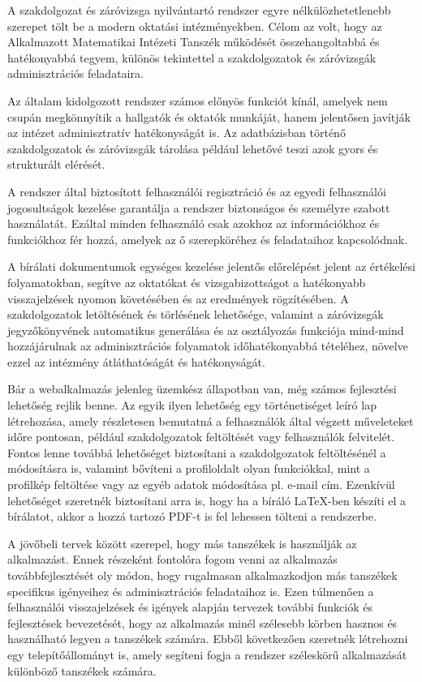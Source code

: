 

A szakdolgozat és záróvizsga nyilvántartó rendszer egyre nélkülözhetetlenebb szerepet tölt be a modern oktatási intézményekben. Célom az volt, hogy az Alkalmazott Matematikai Intézeti Tanszék működését összehangoltabbá és hatékonyabbá tegyem, különös tekintettel a szakdolgozatok és záróvizsgák adminisztrációs feladataira.

Az általam kidolgozott rendszer számos előnyös funkciót kínál, amelyek nem csupán megkönnyítik a hallgatók és oktatók munkáját, hanem jelentősen javítják az intézet adminisztratív hatékonyságát is. Az adatbázisban történő szakdolgozatok és záróvizsgák tárolása például lehetővé teszi azok gyors és strukturált elérését.

A rendszer által biztosított felhasználói regisztráció és az egyedi felhasználói jogosultságok kezelése garantálja a rendszer biztonságos és személyre szabott használatát. Ezáltal minden felhasználó csak azokhoz az információkhoz és funkciókhoz fér hozzá, amelyek az ő szerepköréhez és feladataihoz kapcsolódnak.

A bírálati dokumentumok egységes kezelése jelentős előrelépést jelent az értékelési folyamatokban, segítve az oktatókat és vizsgabizottságot a hatékonyabb visszajelzések nyomon követésében és az eredmények rögzítésében. A szakdolgozatok letöltésének és törlésének lehetősége, valamint a záróvizsgák jegyzőkönyvének automatikus generálása és az osztályozás funkciója mind-mind hozzájárulnak az adminisztrációs folyamatok időhatékonyabbá tételéhez, növelve ezzel az intézmény átláthatóságát és hatékonyságát.

Bár a webalkalmazás jelenleg üzemkész állapotban van, még számos fejlesztési lehetőség rejlik benne. Az egyik ilyen lehetőség egy történetiséget leíró lap létrehozása, amely részletesen bemutatná a felhasználók által végzett műveleteket időre pontosan, például szakdolgozatok feltöltését vagy felhasználók felvitelét. Fontos lenne továbbá lehetőséget biztosítani a szakdolgozatok feltöltésénél a módosításra is, valamint bővíteni a profiloldalt olyan funkciókkal, mint a profilkép feltöltése vagy az egyéb adatok módosítása pl. e-mail cím. Ezenkívül lehetőséget szeretnék biztosítani arra is, hogy ha a bíráló \LaTeX-ben készíti el a bírálatot, akkor a hozzá tartozó PDF-t is fel lehessen tölteni a rendszerbe.

A jövőbeli tervek között szerepel, hogy más tanszékek is használják az alkalmazást. Ennek részeként fontolóra fogom venni az alkalmazás továbbfejlesztését oly módon, hogy rugalmasan alkalmazkodjon más tanszékek specifikus igényeihez és adminisztrációs feladataihoz is. Ezen túlmenően a felhasználói visszajelzések és igények alapján tervezek további funkciók és fejlesztések bevezetését, hogy az alkalmazás minél szélesebb körben hasznos és használható legyen a tanszékek számára. Ebből következően szeretnék létrehozni egy telepítőállományt is, amely segíteni fogja a rendszer széleskörű alkalmazását különböző tanszékek számára.


